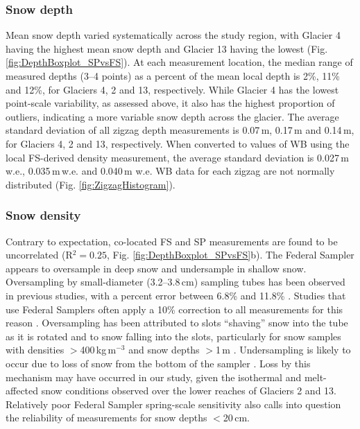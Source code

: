 \documentclass[review,oneside, letterpaper]{igs}
\begin{document}
\subsubsection{Snow depth}
Mean snow depth varied systematically across the study region, with Glacier 4 having the highest mean snow depth and Glacier 13 having the lowest (Fig. \ref{fig:DepthBoxplot_SPvsFS}). At each measurement location, the median range of measured depths (3--4 points) as a percent of the mean local depth is 2\%, 11\% and 12\%, for Glaciers 4, 2 and 13, respectively. While Glacier 4 has the lowest point-scale variability, as assessed above, it also has the highest proportion of outliers, indicating a more variable snow depth across the glacier. The average standard deviation of all zigzag depth measurements is 0.07\,m, 0.17\,m and 0.14\,m, for Glaciers 4, 2 and 13, respectively. When converted to values of WB using the local FS-derived density measurement, the average standard deviation is 0.027\,m\,w.e., 0.035\,m\,w.e. and 0.040\,m w.e. WB data for each zigzag are not normally distributed (Fig. \ref{fig:ZigzagHistogram}).

\subsubsection{Snow density}

Contrary to expectation, co-located FS and SP measurements are found to be uncorrelated (R$^2=0.25$, Fig. \ref{fig:DepthBoxplot_SPvsFS}b). The Federal Sampler appears to oversample in deep snow and undersample in shallow snow. Oversampling by small-diameter (3.2--3.8\,cm) sampling tubes has been observed in previous studies, with a percent error between 6.8\% and 11.8\% \citep[e.g.][]{Work1965, Fames1982, Conger2009}. Studies that use Federal Samplers often apply a 10\% correction to all measurements for this reason \citep[e.g.][]{Molotch2005}. Oversampling has been attributed to slots ``shaving'' snow into the tube as it is rotated \citep[e.g.][]{Dixon2012} and to snow falling into the slots, particularly for snow samples with densities $>$400\,kg\,m$^{-3}$ and snow depths $>$1\,m \citep[e.g.][]{Beaumont1963}. Undersampling is likely to occur due to loss of snow from the bottom of the sampler \citep{Turcan1975}. Loss by this mechanism may have occurred in our study, given the isothermal and melt-affected snow conditions observed over the lower reaches of Glaciers 2 and 13. Relatively poor Federal Sampler spring-scale sensitivity also calls into question the reliability of measurements for snow depths $<$20\,cm.
\end{document}
